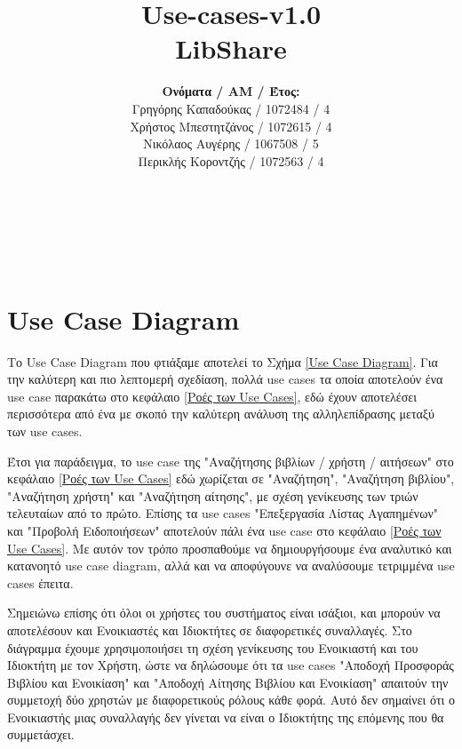 \documentclass[12pt,a4paper]{article}
\title{Use-cases-v1.0 \\ LibShare}
\author{\textbf{Ονόματα / ΑΜ / Έτος:} \\ Γρηγόρης Καπαδούκας / 1072484 / 4\textdegree \\ Χρήστος Μπεστητζάνος / 1072615 / 4\textdegree \\ Νικόλαος Αυγέρης / 1067508 / 5\textdegree \\ Περικλής Κοροντζής / 1072563 / 4\textdegree}
\begin{document}
\makeatletter
\begin{center}
	\LARGE{\@title} \\
	\pagebreak
	\begin{LARGE}\@author\end{LARGE} \\
\end{center}
\pagebreak

\section{Use Case Diagram}

Το Use Case Diagram που φτιάξαμε αποτελεί το Σχήμα \ref{Use Case Diagram}. Για την καλύτερη και πιο λεπτομερή σχεδίαση, πολλά use cases τα οποία αποτελούν ένα use case παρακάτω στο κεφάλαιο \ref{Ροές των Use Cases}, εδώ έχουν αποτελέσει περισσότερα από ένα με σκοπό την καλύτερη ανάλυση της αλληλεπίδρασης μεταξύ των use cases.

Έτσι για παράδειγμα, το use case της "Αναζήτησης βιβλίων / χρήστη / αιτήσεων" στο κεφάλαιο \ref{Ροές των Use Cases} εδώ χωρίζεται σε "Αναζήτηση", "Αναζήτηση βιβλίου", "Αναζήτηση χρήστη" και "Αναζήτηση αίτησης", με σχέση γενίκευσης των τριών τελευταίων από το πρώτο. Επίσης τα use cases "Επεξεργασία Λίστας Αγαπημένων" και "Προβολή Ειδοποιήσεων" αποτελούν πάλι ένα use case στο κεφάλαιο \ref{Ροές των Use Cases}. Με αυτόν τον τρόπο προσπαθούμε να δημιουργήσουμε ένα αναλυτικό και κατανοητό use case diagram, αλλά και να αποφύγουνε να αναλύσουμε τετριμμένα use cases έπειτα.

Σημειώνω επίσης ότι όλοι οι χρήστες του συστήματος είναι ισάξιοι, και μπορούν να αποτελέσουν και Ενοικιαστές και Ιδιοκτήτες σε διαφορετικές συναλλαγές. Στο διάγραμμα έχουμε χρησιμοποιήσει τη σχέση γενίκευσης του Ενοικιαστή και του Ιδιοκτήτη με τον Χρήστη, ώστε να δηλώσουμε ότι τα use cases "Αποδοχή Προσφοράς Βιβλίου και Ενοικίαση" και "Αποδοχή Αίτησης Βιβλίου και Ενοικίαση" απαιτούν την συμμετοχή δύο χρηστών με διαφορετικούς ρόλους κάθε φορά. Αυτό δεν σημαίνει ότι ο Ενοικιαστής μιας συναλλαγής δεν γίνεται να είναι ο Ιδιοκτήτης της επόμενης που θα συμμετάσχει.
\end{document}
